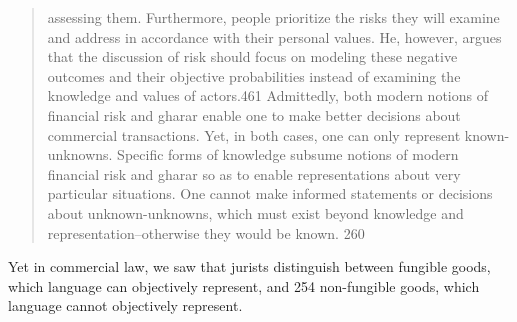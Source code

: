 \begin{quote}
assessing them. Furthermore, people prioritize the risks they will examine and address in
accordance with their personal values. He, however, argues that the discussion of risk
should focus on modeling these negative outcomes and their objective probabilities
instead of examining the knowledge and values of actors.461
Admittedly, both modern notions of financial risk and gharar enable one to make
better decisions about commercial transactions. Yet, in both cases, one can only represent
known-unknowns. Specific forms of knowledge subsume notions of modern financial
risk and gharar so as to enable representations about very particular situations. One
cannot make informed statements or decisions about unknown-unknowns, which must
exist beyond knowledge and representation–otherwise they would be known.
260
\end{quote}

\begin{Synthesis}
 Yet in commercial law, we saw that
jurists distinguish between fungible goods, which language can objectively represent, and
254
non-fungible goods, which language cannot objectively represent.
\end{Synthesis}